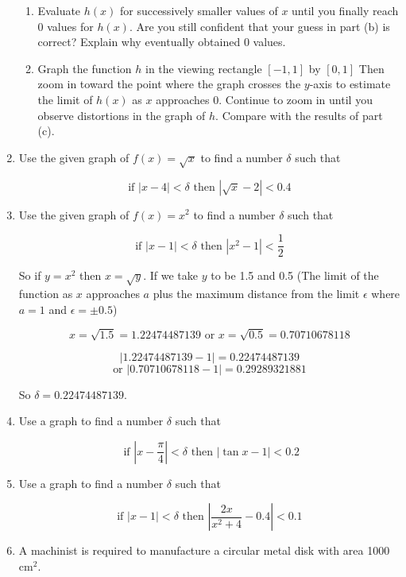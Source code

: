 \documentclass{article}
\begin{document}
\begin{enumerate}
\begin{enumerate}
				\item Evaluate $h(x)$ for successively smaller values of $x$ until you finally reach
					0 values for $h(x)$. Are you still confident that your guess in part (b) is correct?
					Explain why eventually obtained 0 values.
					
				\item Graph the function $h$ in the viewing rectangle $[-1,1]$ by $[0,1]$ Then zoom in
					toward the point where the graph crosses the $y$-axis to estimate the limit of 
					$h(x)$ as $x$ approaches 0. Continue to zoom in until you observe distortions in
					the graph of $h$. Compare with the results of part (c).
			\end{enumerate}
			

			\item Use the given graph of $f(x) = \sqrt{x}$ to find a number $\delta$ such that
			
				$$\text{if } | x - 4 | < \delta\text{ then } |\sqrt{x} - 2 | < 0.4$$

		\item Use the given graph of $f(x) = x^2$ to find a number $\delta$ such that
		
			$$\text{if } |x - 1| < \delta \text{ then } |x^2 - 1| < \frac{1}{2}$$
			
				So if $y = x^2$ then $x = \sqrt{y}$. If we take $y$ to be 1.5 and 0.5 (The limit of the function as $x$ approaches
				$a$ plus the maximum distance from the limit $\epsilon$ where $a = 1$ and $\epsilon = \pm 0.5$)
				
				$$x = \sqrt{1.5} = 1.22474487139 \text{ or } x = \sqrt{0.5} = 0.70710678118$$
				
				$$| 1.22474487139 - 1| = 0.22474487139 $$
				$$ \text{or } |0.70710678118 - 1 | = 0.29289321881$$
				
				So $\delta = 0.22474487139$.
				
		\item Use a graph to find a number $\delta$ such that
		
			$$\text{ if } | x - \frac{\pi}{4} | < \delta \text{ then } | \tan x - 1 | < 0.2$$
			
		\item Use a graph to find a number $\delta$ such that 
		
			$$\text{if } | x - 1 | < \delta \text{ then } | \frac{2x}{x^2 + 4} - 0.4 | < 0.1$$
			
		\item A machinist is required to manufacture a circular metal disk with area 1000$\text{cm}^2$.
		

\end{enumerate}
\end{document}
